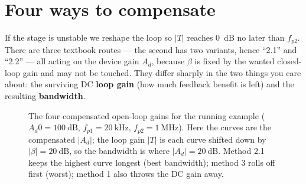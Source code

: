\documentclass[11pt,a4paper,oneside]{book}
\newcommand{\Ad}{A_d}
\begin{document}
\section{Four ways to compensate}\label{sec:compensation}
If the stage is unstable we reshape the loop so $|T|$ reaches \qty{0}{\dB} no
later than $f_{p2}$. There are three textbook routes --- the second has two
variants, hence ``2.1'' and ``2.2'' --- all acting on the device gain $\Ad$,
because $\beta$ is fixed by the wanted closed-loop gain and may not be touched.
They differ sharply in the two things you care about: the surviving DC
\textbf{loop gain} (how much feedback benefit is left) and the resulting
\textbf{bandwidth}.

\begin{figure}[h]\centering
{}
\caption{The four compensated open-loop gains for the running example
($\Ad0=\qty{100}{\dB}$, $f_{p1}=\qty{20}{\kilo\hertz}$,
$f_{p2}=\qty{1}{\mega\hertz}$). Here the curves are the
compensated $|\Ad|$; the loop gain $|T|$ is each curve shifted down by
$|\beta|=\qty{20}{\dB}$, so the bandwidth is where $|\Ad|=\qty{20}{\dB}$. Method
2.1 keeps the highest curve longest (best bandwidth); method 3 rolls off first
(worst); method 1 also throws the DC gain away.}
\label{fig:compensation}
\end{figure}
\end{document}

